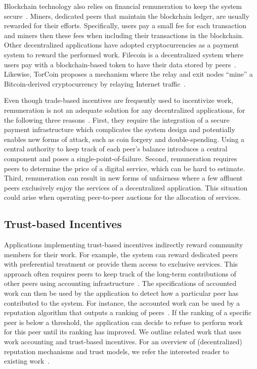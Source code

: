 Blockchain technology also relies on financial remuneration to keep the system secure~\cite{easley2019mining}.
Miners, dedicated peers that maintain the blockchain ledger, are usually rewarded for their efforts.
Specifically, users pay a small fee for each transaction and miners then these fees when including their transactions in the blockchain.
Other decentralized applications have adopted cryptocurrencies as a payment system to reward the performed work.
Filecoin is a decentralized system where users pay with a blockchain-based token to have their data stored by peers~\cite{benet2018filecoin}.
Likewise, TorCoin proposes a mechanism where the relay and exit nodes \enquote{mine} a Bitcoin-derived cryptocurrency by relaying Internet traffic~\cite{ghosh2014torpath}.

Even though trade-based incentives are frequently used to incentivize work, remuneration is not an adequate solution for any decentralized applications, for the following three reasons~\cite{hummel2003earning}.
First, they require the integration of a secure payment infrastructure which complicates the system design and potentially enables new forms of attack, such as coin forgery and double-spending.
Using a central authority to keep track of each peer's balance introduces a central component and poses a single-point-of-failure.
Second, remuneration requires peers to determine the price of a digital service, which can be hard to estimate.
Third, remuneration can result in new forms of unfairness where a few affluent peers exclusively enjoy the services of a decentralized application.
This situation could arise when operating peer-to-peer auctions for the allocation of services.

\subsection{Trust-based Incentives}
Applications implementing trust-based incentives indirectly reward community members for their work.
For example, the system can reward dedicated peers with preferential treatment or provide them access to exclusive services.
This approach often requires peers to keep track of the long-term contributions of other peers using accounting infrastructure~\cite{meulpolder2009bartercast}.
The specifications of accounted work can then be used by the application to detect how a particular peer has contributed to the system.
For instance, the accounted work can be used by a reputation algorithm that outputs a ranking of peers~\cite{karakaya2009free}.
If the ranking of a specific peer is below a threshold, the application can decide to refuse to perform work for this peer until its ranking has improved.
We outline related work that uses work accounting and trust-based incentives.
For an overview of (decentralized) reputation mechanisms and trust models, we refer the interested reader to existing work~\cite{hendrikx2015reputation,bellini2020blockchain}.

